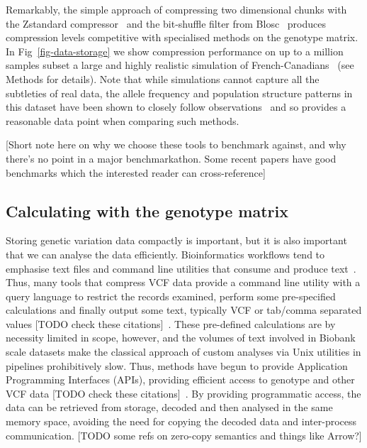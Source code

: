 \documentclass[a4paper,num-refs]{oup-contemporary}
\begin{document}
Remarkably, the simple approach of compressing
two dimensional chunks with the Zstandard 
compressor~\citep{collet2021rfc} and the bit-shuffle
filter from Blosc~\cite{alted2010modern} produces 
compression levels competitive with specialised methods
on the genotype matrix. In Fig~\ref{fig-data-storage}
we show compression performance on up to a million
samples subset a large and highly realistic 
simulation of French-Canadians~\cite{anderson2023on}
(see Methods for details).
Note that while simulations cannot capture 
all the subtleties of real data, the allele frequency
and population structure patterns in this dataset 
have been shown to closely follow 
observations~\cite{anderson2023on} and so provides 
a reasonable data point when comparing such methods.

[Short note here on why we choose these tools to
benchmark against, and why there's no point in 
a major benchmarkathon. Some recent papers 
have good benchmarks which the interested 
reader can cross-reference]

\subsection{Calculating with the genotype matrix}
Storing genetic variation data compactly is important, but it is also
important that we can analyse the data efficiently. Bioinformatics 
workflows tend to emphasise text files and command line utilities 
that consume and produce text~\citep[e.g.][]{buffalo2015bioinformatics}. 
Thus, many tools that compress VCF data provide a command line 
utility with a query language to restrict the records
examined, perform some pre-specified calculations and finally 
output some text, typically VCF or tab/comma separated values
[TODO check these citations]~\citep{
layer2016efficient, %
li2016bgt, %
tatwawadi2016gtrac, %
danek2018gtc, %
lin2020sparse, %
lan2020genozip,lan2021genozip, %
lefaive2021sparse, %
wertenbroek2022xsi,%
zhang2023gbc}. %
These pre-defined calculations are by necessity limited in scope, however,
and the volumes of text involved in Biobank scale datasets
make the classical approach of custom
analyses via Unix utilities in pipelines prohibitively slow. Thus, 
methods have begun to provide Application Programming Interfaces
(APIs), providing efficient access to genotype and other VCF data
[TODO check these citations]~\cite[e.g.][]{kelleher2013processing,lefaive2021sparse,
wertenbroek2022xsi,zhang2023gbc}. By providing programmatic access,
the data can be retrieved from storage, decoded and then analysed
in the same memory space, avoiding the need for copying
the decoded data and inter-process communication. [TODO some refs
on zero-copy semantics and things like Arrow?]
\end{document}
